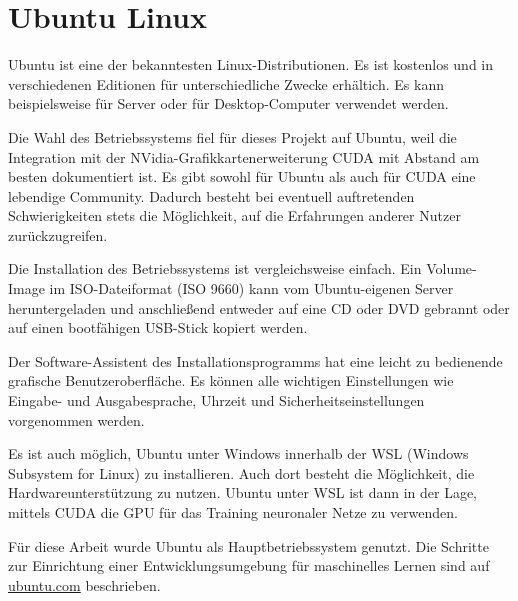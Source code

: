 \section{Ubuntu Linux}
\label{subsec:ubuntu}
Ubuntu ist eine der bekanntesten Linux-Distributionen. Es ist kostenlos und in verschiedenen Editionen für unterschiedliche Zwecke erhältich. Es kann beispielsweise für Server oder für Desktop-Computer verwendet werden.

Die Wahl des Betriebssystems fiel für dieses Projekt auf Ubuntu, weil die Integration mit der NVidia-Grafikkartenerweiterung CUDA mit Abstand am besten dokumentiert ist. Es gibt sowohl für Ubuntu als auch für CUDA eine lebendige Community. Dadurch besteht bei eventuell auftretenden Schwierigkeiten stets die Möglichkeit, auf die Erfahrungen anderer Nutzer zurückzugreifen.

Die Installation des Betriebssystems ist vergleichsweise einfach. Ein Volume-Image im ISO-Dateiformat (ISO 9660) kann vom Ubuntu-eigenen Server heruntergeladen und anschließend entweder auf eine CD oder DVD gebrannt oder auf einen bootfähigen USB-Stick kopiert werden.

Der Software-Assistent des Installationsprogramms hat eine leicht zu bedienende grafische Benutzeroberfläche. Es können alle wichtigen Einstellungen wie Eingabe- und Ausgabesprache, Uhrzeit und Sicherheitseinstellungen vorgenommen werden.

Es ist auch möglich, Ubuntu unter Windows innerhalb der WSL (Windows Subsystem for Linux) zu installieren. Auch dort besteht die Möglichkeit, die Hardwareunterstützung zu nutzen. Ubuntu unter WSL ist dann in der Lage, mittels CUDA die GPU für das Training neuronaler Netze zu verwenden.

Für diese Arbeit wurde Ubuntu als Hauptbetriebssystem genutzt. Die Schritte zur Einrichtung einer Entwicklungsumgebung für maschinelles Lernen sind auf \href{https://ubuntu.com/tutorials/enabling-gpu-acceleration-on-ubuntu-on-wsl2-with-the-nvidia-cuda-platform#1-overview}{ubuntu.com} beschrieben.



